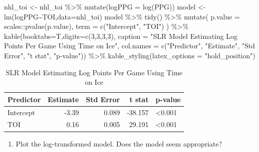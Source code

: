 \documentclass[
  11pt,
]{book}
\newenvironment{Shaded}{\begin{snugshade}}{\end{snugshade}}
\newcommand{\AttributeTok}[1]{\textcolor[rgb]{0.77,0.63,0.00}{#1}}
\newcommand{\DecValTok}[1]{\textcolor[rgb]{0.00,0.00,0.81}{#1}}
\newcommand{\FunctionTok}[1]{\textcolor[rgb]{0.00,0.00,0.00}{#1}}
\newcommand{\NormalTok}[1]{#1}
\newcommand{\OtherTok}[1]{\textcolor[rgb]{0.56,0.35,0.01}{#1}}
\newcommand{\SpecialCharTok}[1]{\textcolor[rgb]{0.00,0.00,0.00}{#1}}
\newcommand{\StringTok}[1]{\textcolor[rgb]{0.31,0.60,0.02}{#1}}
\providecommand{\tightlist}{%
  \setlength{\itemsep}{0pt}\setlength{\parskip}{0pt}}
\theoremstyle{definition}
\theoremstyle{definition}
\theoremstyle{definition}
\theoremstyle{definition}
\theoremstyle{remark}
\begin{document}
\begin{Shaded}
\begin{Highlighting}[]
\NormalTok{nhl\_toi }\OtherTok{\textless{}{-}}\NormalTok{ nhl\_toi }\SpecialCharTok{\%\textgreater{}\%} \FunctionTok{mutate}\NormalTok{(}\AttributeTok{logPPG =} \FunctionTok{log}\NormalTok{(PPG))}
\NormalTok{model }\OtherTok{\textless{}{-}} \FunctionTok{lm}\NormalTok{(logPPG}\SpecialCharTok{\textasciitilde{}}\NormalTok{TOI,}\AttributeTok{data=}\NormalTok{nhl\_toi)}
\NormalTok{model }\SpecialCharTok{\%\textgreater{}\%} \FunctionTok{tidy}\NormalTok{() }\SpecialCharTok{\%\textgreater{}\%}
  \FunctionTok{mutate}\NormalTok{(}
    \AttributeTok{p.value =}\NormalTok{ scales}\SpecialCharTok{::}\FunctionTok{pvalue}\NormalTok{(p.value),}
    \AttributeTok{term =} \FunctionTok{c}\NormalTok{(}\StringTok{"Intercept"}\NormalTok{, }\StringTok{"TOI"}\NormalTok{)}
\NormalTok{  ) }\SpecialCharTok{\%\textgreater{}\%}
  \FunctionTok{kable}\NormalTok{(}\AttributeTok{booktabs=}\NormalTok{T,}\AttributeTok{digits=}\FunctionTok{c}\NormalTok{(}\DecValTok{3}\NormalTok{,}\DecValTok{3}\NormalTok{,}\DecValTok{3}\NormalTok{,}\DecValTok{3}\NormalTok{), }
        \AttributeTok{caption =} \StringTok{"SLR Model Estimating Log Points Per Game Using Time on Ice"}\NormalTok{,}
        \AttributeTok{col.names =} \FunctionTok{c}\NormalTok{(}\StringTok{"Predictor"}\NormalTok{, }\StringTok{"Estimate"}\NormalTok{, }\StringTok{"Std Error"}\NormalTok{, }\StringTok{"t stat"}\NormalTok{, }\StringTok{"p{-}value"}\NormalTok{)) }\SpecialCharTok{\%\textgreater{}\%}
  \FunctionTok{kable\_styling}\NormalTok{(}\AttributeTok{latex\_options =} \StringTok{"hold\_position"}\NormalTok{)}
\end{Highlighting}
\end{Shaded}

\begin{table}[!h]

\caption{\label{tab:unnamed-chunk-246}SLR Model Estimating Log Points Per Game Using Time on Ice}
\centering
\begin{tabular}[t]{lrrrl}
\toprule
Predictor & Estimate & Std Error & t stat & p-value\\
\midrule
Intercept & -3.39 & 0.089 & -38.157 & <0.001\\
TOI & 0.16 & 0.005 & 29.191 & <0.001\\
\bottomrule
\end{tabular}
\end{table}

\newpage

\begin{enumerate}
\def\labelenumi{(\alph{enumi})}
\setcounter{enumi}{5}
\tightlist
\item
  Plot the log-transformed model. Does the model seem appropriate?
\end{enumerate}
\end{document}
